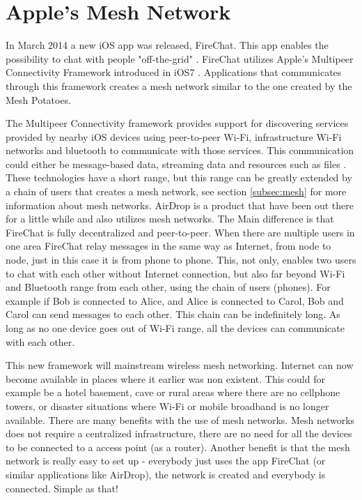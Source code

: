 \section{Apple's Mesh Network}
In March 2014 a new iOS app was released, FireChat. This app enables the possibility to chat with people "off-the-grid" \cite{fireChat}. FireChat utilizes Apple's Multipeer Connectivity Framework introduced in iOS7 \cite{appleMesh}. Applications that communicates through this framework creates a mesh network similar to the one created by the Mesh Potatoes. 

The Multipeer Connectivity framework provides support for discovering services provided by nearby iOS devices using peer-to-peer Wi-Fi, infrastructure Wi-Fi networks and bluetooth to communicate with those services. This communication could either be message-based data, streaming data and resources such as files \cite{multipeer}. These technologies have a short range, but this range can be greatly extended by a chain of users that creates a mesh network, see section \ref{subsec:mesh} for more information about mesh networks. AirDrop is a product that have been out there for a little while and also utilizes mesh networks. The Main difference is that FireChat is fully decentralized and peer-to-peer. When there are multiple users in one area FireChat relay messages in the same way as Internet, from node to node, just in this case it is from phone to phone.  This, not only, enables two users to chat with each other without Internet connection, but also far beyond Wi-Fi and Bluetooth range from each other, using the chain of users (phones). For example if Bob is connected to Alice, and Alice is connected to Carol, Bob and Carol can send messages to each other. This chain can be indefinitely long. As long as no one device goes out of Wi-Fi range, all the devices can communicate with each other. 

This new framework will mainstream wireless mesh networking. Internet can now become available in places where it earlier was non existent. This could for example be a hotel basement, cave or rural areas where there are no cellphone towers, or disaster situations where Wi-Fi or mobile broadband  is no longer available. There are many benefits with the use of mesh networks. Mesh networks does not require a centralized infrastructure, there are no need for all the devices to be connected to a access point (as a router). Another benefit is that the mesh network is really easy to set up - everybody just uses the app FireChat (or similar applications like AirDrop), the network is created and everybody is connected. Simple as that! 


